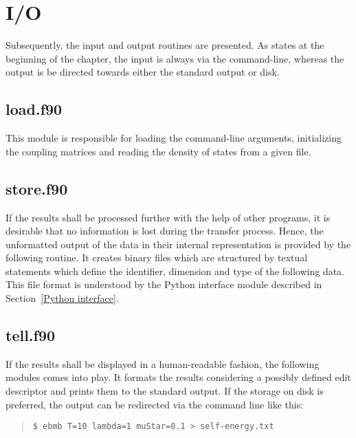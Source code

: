 

\section{I/O}

Subsequently, the input and output routines are presented. As states at the
beginning of the chapter, the input is always via the command-line, whereas the
output is be directed towards either the standard output or disk.

\subsection{load.f90}

This module is responsible for loading the command-line arguments, initializing
the coupling matrices and reading the density of states from a given file.



\subsection{store.f90}

If the results shall be processed further with the help of other programs, it is
desirable that no information is lost during the transfer process. Hence, the
unformatted output of the data in their internal representation is provided by
the following routine. It creates binary files which are structured by textual
statements which define the identifier, dimension and type of the following
data. This file format is understood by the Python interface module described in
Section~\ref{Python interface}.



\subsection{tell.f90}

If the results shall be displayed in a human-readable fashion, the following
modules comes into play. It formats the results considering a possibly defined
edit descriptor and prints them to the standard output. If the storage on disk
is preferred, the output can be redirected via the command line like this:
%
\begin{quote}
    \verb|$ ebmb T=10 lambda=1 muStar=0.1 > self-energy.txt|
\end{quote}

